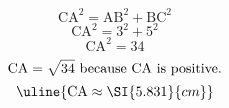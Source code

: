 \[\text{CA}^{2}=\text{AB}^{2}+\text{BC}^{2}\]
\[\text{CA}^{2}=3^{2}+5^{2}\]
\[\text{CA}^{2}=34\]
\[\text{CA}=\sqrt{\mathstrut 34}\text{ because CA is positive.}\]
\[\uline{\text{CA}\approx\SI{5.831}{cm}}\]
